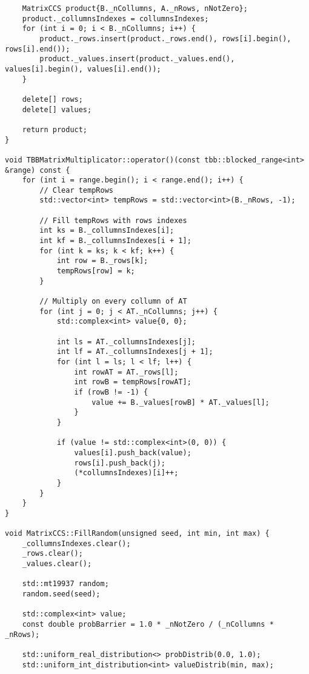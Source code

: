 \documentclass{report}
\begin{document}
\begin{lstlisting}
    MatrixCCS product{B._nCollumns, A._nRows, nNotZero};
    product._collumnsIndexes = collumnsIndexes;
    for (int i = 0; i < B._nCollumns; i++) {
        product._rows.insert(product._rows.end(), rows[i].begin(), rows[i].end());
        product._values.insert(product._values.end(), values[i].begin(), values[i].end());
    }

    delete[] rows;
    delete[] values;

    return product;
}

void TBBMatrixMultiplicator::operator()(const tbb::blocked_range<int> &range) const {
    for (int i = range.begin(); i < range.end(); i++) {
        // Clear tempRows
        std::vector<int> tempRows = std::vector<int>(B._nRows, -1);

        // Fill tempRows with rows indexes
        int ks = B._collumnsIndexes[i];
        int kf = B._collumnsIndexes[i + 1];
        for (int k = ks; k < kf; k++) {
            int row = B._rows[k];
            tempRows[row] = k;
        }

        // Multiply on every collumn of AT
        for (int j = 0; j < AT._nCollumns; j++) {
            std::complex<int> value{0, 0};

            int ls = AT._collumnsIndexes[j];
            int lf = AT._collumnsIndexes[j + 1];
            for (int l = ls; l < lf; l++) {
                int rowAT = AT._rows[l];
                int rowB = tempRows[rowAT];
                if (rowB != -1) {
                    value += B._values[rowB] * AT._values[l];
                }
            }

            if (value != std::complex<int>(0, 0)) {
                values[i].push_back(value);
                rows[i].push_back(j);
                (*collumnsIndexes)[i]++;
            }
        }
    }
}

void MatrixCCS::FillRandom(unsigned seed, int min, int max) {
    _collumnsIndexes.clear();
    _rows.clear();
    _values.clear();

    std::mt19937 random;
    random.seed(seed);

    std::complex<int> value;
    const double probBarrier = 1.0 * _nNotZero / (_nCollumns * _nRows);

    std::uniform_real_distribution<> probDistrib(0.0, 1.0);
    std::uniform_int_distribution<int> valueDistrib(min, max);


\end{lstlisting}
\end{document}
